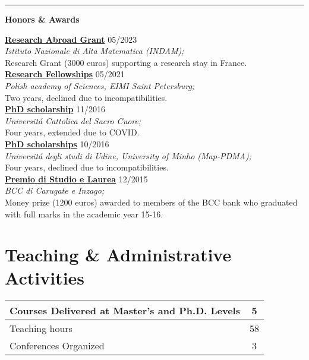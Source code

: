 \documentclass[a4paper]{article}
\newcommand{\block}[1]{\hrule \vspace{0.2cm} \textbf{\Large #1} \vspace{0.2cm}}
\newcommand{\voice}[5]{\href{#4}{\textbf{#1}} \hfill #2 \\ \textit{#3} \\ {\small #5} \vspace{0.2cm} \\}
\begin{document}

	\block{Honors \& Awards}

	\voice{Research Abroad Grant}
		{05/2023}
		{Istituto Nazionale di Alta Matematica (INDAM);}
		{https://www.altamatematica.it/wp-content/uploads/2022/12/bando-estero-2022-2023-1.pdf}       
		{Research Grant (3000 euros) supporting a research stay in France.}
	\voice{Research Fellowships}
		{05/2021}
		{Polish academy of Sciences, EIMI Saint Petersburg;}
		{}       
		{Two years, declined due to incompatibilities.}
	\voice{PhD scholarship}
		{11/2016}
		{Universit\'a Cattolica del Sacro Cuore;}
		{https://www.dropbox.com/s/pmsg20xsxd6x5yf/External_Scholarship.pdf?dl=0}       
		{Four years, extended due to COVID.}
	\voice{PhD scholarships}
		{10/2016}
		{Universit\'a degli studi di Udine, University of Minho (Map-PDMA);}
		{}       
		{Four years, declined due to incompatibilities.}
	\voice{Premio di Studio e Laurea}
		{12/2015}
		{BCC di Carugate e Inzago;}
		{https://web.archive.org/web/20191207203437/https://www.bccmilano.it/news/dettaglio_news_div.asp?i_menuID=54872&hNewsID=132411}       
		{Money prize (1200 euros) awarded to members of the BCC bank who graduated with full marks in the academic year 15-16.}

	\clearpage
	\section*{Teaching \& Administrative Activities}

		\begin{center}
	\begin{tabularx}{.5\linewidth}{|X|c|}
	\hline
	
	Courses Delivered at Master's and Ph.D. Levels & 5 \\
	\hline
	
	Teaching hours & 58 \\
	\hline

	Conferences Organized & 3 \\
	\hline	
	
	\end{tabularx}		
		\end{center}
	\vspace{1em}
\end{document}
